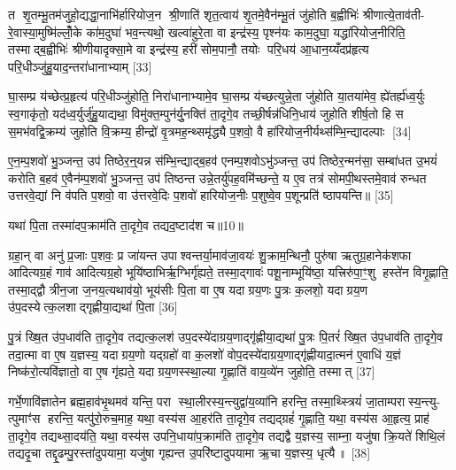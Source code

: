 त शृ॒तम्भू॒तम॑जुहो॒द्यद्धा॒नाभि॑र्\mbox{}हारियोज॒न श्री॒णाति॑ शृत॒त्वाय॑ शृ॒तमे॒वैन॑म्भू॒तं जु॑होति ब॒ह्वीभिः॑ श्रीणात्ये॒ताव॑ती- रे॒वास्या॒मुष्मि॑ल्लोँ॒के का॑म॒दुघा॑ भव॒न्त्यथो॒ खल्वा॑हुरे॒ता वा इन्द्र॑स्य॒ पृश्न॑यः काम॒दुघा॒ यद्धा॑रियोज॒नीरिति॒ तस्माद्ब॒ह्वीभिः॑ श्रीणीयादृक्सा॒मे वा इन्द्र॑स्य॒ हरी॑ सोम॒पानौ॒ तयोः परि॒धय॑ आ॒धान॒य्यँदप्र॑हृत्य परि॒धीञ्जु॑हु॒याद॒न्तरा॑धानाभ्याम् [33]

घा॒सम्प्र य॑च्छेत्प्र॒हृत्य॑ परि॒धीञ्जु॑होति॒ निरा॑धानाभ्यामे॒व घा॒सम्प्र य॑च्छत्युन्ने॒ता जु॑होति या॒तया॑मेव॒ ह्ये॑तर्\mbox{}ह्य॑ध्व॒र्युः स्व॒गाकृ॑तो॒ यद॑ध्व॒र्युर्जु॑हु॒याद्यथा॒ विमु॑क्त॒म्पुन॑र्यु॒नक्ति॑ ता॒दृगे॒व तच्छी॒र्\mbox{}षन्न॑धिनि॒धाय॑ जुहोति शीर्\mbox{}ष॒तो हि स स॒मभ॑वद्वि॒क्रम्य॑ जुहोति वि॒क्रम्य॒ हीन्द्रो॑ वृ॒त्रमह॒न्थ्समृ॑द्ध्यै प॒शवो॒ वै हा॑रियोज॒नीर्यथ्स॑म्भि॒न्द्यादल्पाः [34]

ए॒न॒म्प॒शवो॑ भु॒ञ्जन्त॒ उप॑ तिष्ठेर॒न्॒यन्न स॑म्भि॒न्द्याद्ब॒हव॑ एनम्प॒शवोऽभु॑ञ्जन्त॒ उप॑ तिष्ठेर॒न्मन॑सा॒ सम्बा॑धत उ॒भयं॑ करोति ब॒हव॑ ए॒वैन॑म्प॒शवो॑ भु॒ञ्जन्त॒ उप॑ तिष्ठन्त उन्ने॒तर्यु॑पह॒वमि॑च्छन्ते॒ य ए॒व तत्र॑ सोमपी॒थस्तमे॒वाव॑ रुन्धत उत्तरवे॒द्यां नि व॑पति प॒शवो॒ वा उ॑त्तरवे॒दिः प॒शवो॑ हारियोज॒नीः प॒शुष्वे॒व प॒शून्प्रति॑ ष्ठापयन्ति॥ [35]

{\scriptsize {यथा॑ पि॒ता तस्मा॑दप॒क्राम॑ति ता॒दृगे॒व तद्यद॒ष्टाद॑श च॥10॥}}

ग्रहा॒न् वा अनु॑ प्र॒जाः प॒शवः॒ प्र जा॑यन्त उपाश्वन्तर्या॒माव॑जा॒वयः॑ शु॒क्राम॒न्थिनौ॒ पुरु॑षा ऋतुग्र॒हानेक॑शफा आदित्यग्र॒हं गाव॑ आदित्यग्र॒हो भूयि॑ष्ठाभिर्\mbox{}ऋ॒ग्भिर्गृ॑ह्यते॒ तस्मा॒द्गावः॑ पशू॒नाम्भूयि॑ष्ठा॒ यत्त्रिरु॑पा॒ꣳ॒शु हस्ते॑न विगृ॒ह्णाति॒ तस्मा॒द्द्वौ त्रीन॒जा ज॒नय॒त्यथाव॑यो॒ भूय॑सीः पि॒ता वा ए॒ष यदाग्रय॒णः पु॒त्रः क॒लशो॒ यदाग्रय॒ण उ॑प॒दस्येत्क॒लशाद्गृह्णीया॒द्यथा॑ पि॒ता [36]

पु॒त्रं ख्षि॒त उ॑प॒धाव॑ति ता॒दृगे॒व तद्यत्क॒लश॑ उप॒दस्ये॑दाग्रय॒णाद्गृ॑ह्णीया॒द्यथा॑ पु॒त्रः पि॒तरं॑ ख्षि॒त उ॑प॒धाव॑ति ता॒दृगे॒व तदा॒त्मा वा ए॒ष य॒ज्ञस्य॒ यदाग्रय॒णो यद्ग्रहो॑ वा क॒लशो॑ वोप॒दस्ये॑दाग्रय॒णाद्गृ॑ह्णीयादा॒त्मन॑ ए॒वाधि॑ य॒ज्ञं निष्क॑रो॒त्यवि॑ज्ञातो॒ वा ए॒ष गृ॑ह्यते॒ यदाग्रय॒णस्स्था॒ल्या गृ॒ह्णाति॑ वाय॒व्ये॑न जुहोति॒ तस्मात् [37]

गर्भे॒णावि॑ज्ञातेन ब्रह्म॒हाव॑भृ॒थमव॑ यन्ति॒ परा स्था॒लीरस्य॒न्त्युद्वा॑य॒व्या॑नि हरन्ति॒ तस्मा॒थ्स्त्रियं॑ जा॒ताम्परास्य॒न्त्यु- त्पुमाꣳ॑स हरन्ति॒ यत्पु॑रो॒रुच॒माह॒ यथा॒ वस्य॑स आ॒हर॑ति ता॒दृगे॒व तद्यद्ग्रहं॑ गृ॒ह्णाति॒ यथा॒ वस्य॑स आ॒हृत्य॒ प्राह॑ ता॒दृगे॒व तद्यथ्सा॒दय॑ति॒ यथा॒ वस्य॑स उपनि॒धाया॑प॒क्राम॑ति ता॒दृगे॒व तद्यद्वै य॒ज्ञस्य॒ साम्ना॒ यजु॑षा क्रि॒यते॑ शिथि॒लं तद्यदृ॒चा तद्दृ॒ढम्पु॒रस्ता॑दुपयामा॒ यजु॑षा गृह्यन्त उ॒परि॑ष्टादुपयामा ऋ॒चा य॒ज्ञस्य॒ धृत्यै॥ [38]

